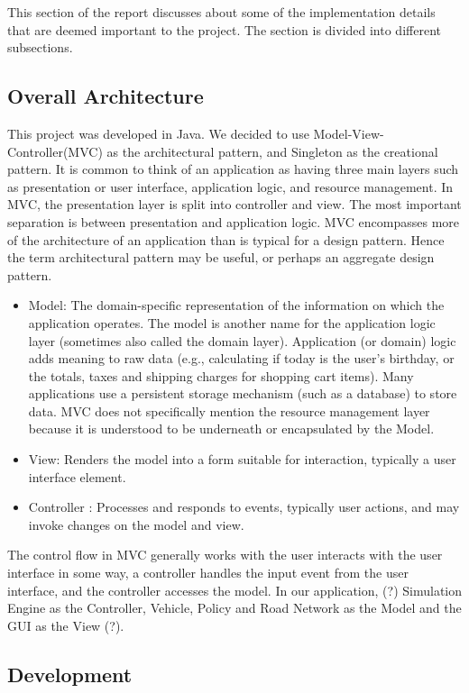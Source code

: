 \documentclass[11pt]{article}
\begin{document}
\begin{itemize}
This section of the report discusses about some of the implementation details that are deemed important to the project. The section is divided into different subsections.
\subsection{Overall Architecture}
This project was developed in Java. We decided to use Model-View-Controller(MVC) as the architectural pattern, and Singleton as the creational pattern. It is common to think of an application as having three main
layers such as presentation or user interface, application logic, and resource management. In MVC, the presentation
layer is split into controller and view. The most important separation is between presentation and
application logic. MVC encompasses more of the architecture of an application than is typical for a design pattern. Hence the term architectural pattern may be useful, or perhaps an aggregate design pattern.
    \begin{itemize}
    \item Model: The domain-specific representation of the information on which the application operates.
    The model is another name for the application logic layer (sometimes also called the
    domain layer). Application (or domain) logic adds meaning to raw data (e.g., calculating if today
    is the user’s birthday, or the totals, taxes and shipping charges for shopping cart items).
    Many applications use a persistent storage mechanism (such as a database) to store data.
    MVC does not specifically mention the resource management layer because it is understood
    to be underneath or encapsulated by the Model.
    \item View: Renders the model into a form suitable for interaction, typically a user interface
    element.
    \item Controller : Processes and responds to events, typically user actions, and may invoke changes
    on the model and view.
    \end{itemize}

The control flow in MVC generally works with the user interacts with the user interface in some way, a controller handles the input event from the user interface, and the controller accesses the model. In our application, (?)
Simulation Engine as the Controller, Vehicle, Policy and Road Network as the Model and the GUI as the View (?). 


\subsection{Development}

\end{itemize}
\end{document}

